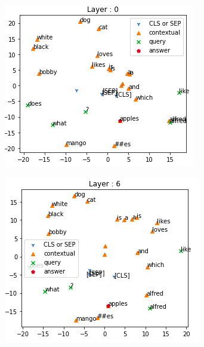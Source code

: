 \documentclass[10pt,twocolumn,letterpaper]{article}
\begin{document}
\begin{figure}[!htp]
    \centering
    \begin{subfigure}[t]{0.65\columnwidth}
    \centering
    \includegraphics[width=\linewidth]{l0.png}
    \end{subfigure}
    \begin{subfigure}[t]{0.65\columnwidth}
    \centering
    \includegraphics[width=\linewidth]{l6.png}
    \end{subfigure}
    \begin{subfigure}[t]{0.65\columnwidth}

\end{subfigure}
\end{figure}
\end{document}

